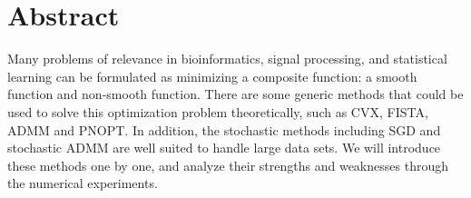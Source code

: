\documentclass[
10pt, %
a4paper, %
oneside, %
headinclude,footinclude, %
BCOR5mm, %
]{scrartcl}
\title{\normalfont\spacedallcaps{Optimizing Composite Functions}}
\author{\spacedlowsmallcaps{A *} \\ 
\texttt{\href{mailto:A@gmail.com}{A@gmail.com}} }
\date{\today} %
\begin{document}

\renewcommand{\sectionmark}[1]{\markright{\spacedlowsmallcaps{#1}}} 
\lehead{\mbox{\llap{\small\thepage\kern1em\color{halfgray} 
\vline}\color{halfgray}\hspace{0.5em}\rightmark\hfil}} %

\pagestyle{scrheadings} %


\maketitle %

\setcounter{tocdepth}{2} 

\tableofcontents %

\listoffigures %

\listoftables %


\section*{Abstract} 

Many problems of relevance in bioinformatics, signal processing, and statistical 
learning can be formulated as minimizing a composite function: a smooth 
function and  non-smooth function. There are some generic methods that could be 
used to solve this optimization problem theoretically, such as CVX, FISTA, ADMM 
and PNOPT. In addition, the stochastic methods including SGD and stochastic 
ADMM are well suited to handle large data sets. We will introduce these methods 
one by one, and analyze their strengths and weaknesses through the numerical 
experiments.
\end{document}
